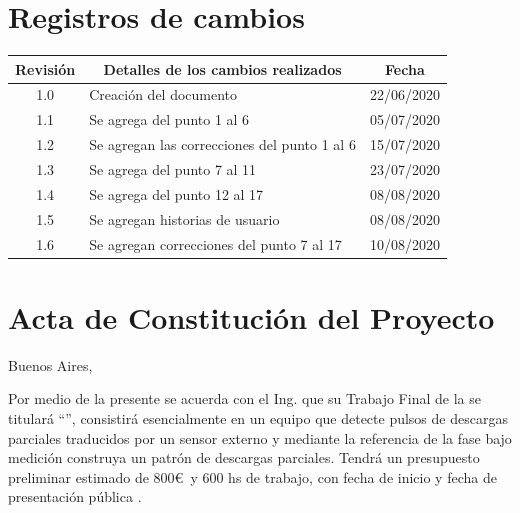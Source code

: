 \documentclass[11pt]{charter}
\begin{document}
\maketitle
\thispagestyle{empty}
\pagebreak


\thispagestyle{empty}
{\setlength{\parskip}{0pt}
\tableofcontents{}
}
\pagebreak


\section{Registros de cambios}
\label{sec:registro}


\begin{table}[ht]
\label{tab:registro}
\centering

\begin{tabularx}{\linewidth}{@{}|c|X|c|@{}}
\hline
\rowcolor[HTML]{C0C0C0} 
Revisión & \multicolumn{1}{c|}{\cellcolor[HTML]{C0C0C0}Detalles de los cambios realizados} & Fecha      \\ \hline
1.0      & 	Creación del documento     							& 22/06/2020 \\ \hline
1.1      & 	Se agrega del punto 1 al 6	 						& 05/07/2020 \\ \hline
1.2      & 	Se agregan las correcciones del punto 1 al 6		& 15/07/2020 \\ \hline
1.3      & 	Se agrega del punto 7 al 11							& 23/07/2020 \\ \hline
1.4      & 	Se agrega del punto 12 al 17						& 08/08/2020 \\ \hline
1.5      & 	Se agregan historias de usuario						& 08/08/2020 \\ \hline
1.6      & 	Se agregan correcciones del punto 7 al 17			& 10/08/2020 \\ \hline
\end{tabularx}
\end{table}

\pagebreak



\section{Acta de Constitución del Proyecto}
\label{sec:acta}

\begin{flushright}
Buenos Aires, \fechaInicioName
\end{flushright}

\vspace{2 cm}

Por medio de la presente se acuerda con el Ing. \authorname\hspace{1px} que su Trabajo Final de la \degreename\hspace{1px} se titulará ``\ttitle'', consistirá esencialmente en un equipo que detecte pulsos de descargas parciales traducidos por un sensor externo y mediante la referencia de la fase bajo medición construya un patrón de descargas parciales. Tendrá un presupuesto preliminar estimado de 800\euro\ y 600 hs de trabajo, con fecha de inicio \fechaInicioName\hspace{1px} y fecha de presentación pública \fechaFinalName.
\end{document}
